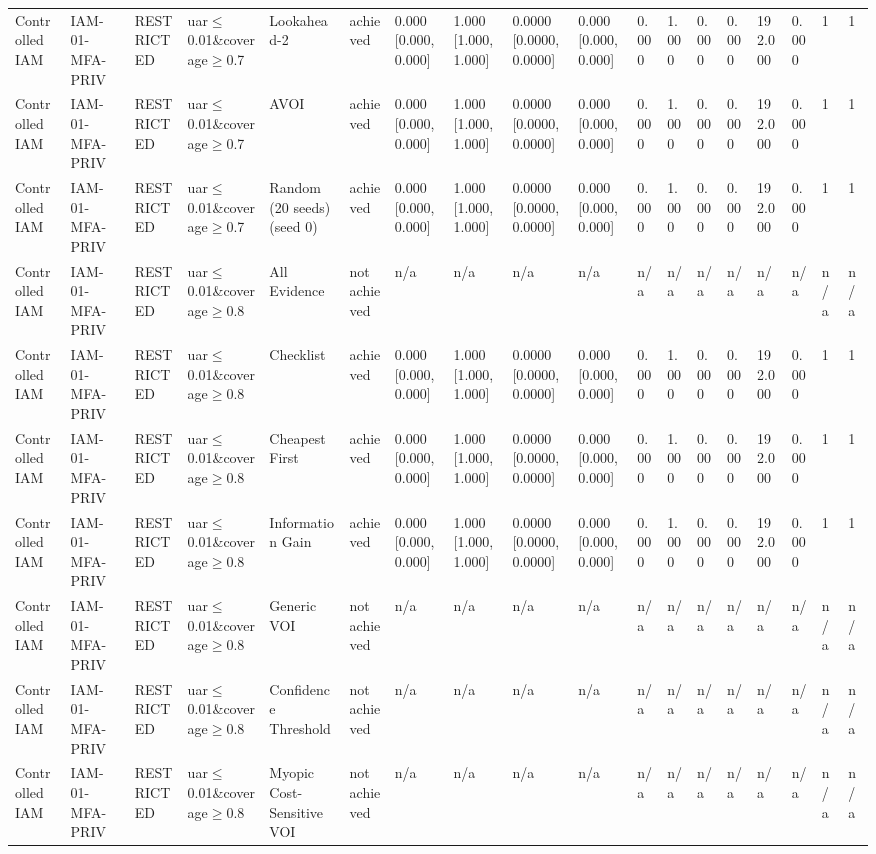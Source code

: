 \begin{table}[!ht]
{\begin{tabular}{llllllllllllllllll}
Controlled IAM & IAM-01-MFA-PRIV & RESTRICTED & uar$\le$0.01\&coverage$\ge$0.7 & Lookahead-2 & achieved & 0.000 [0.000, 0.000] & 1.000 [1.000, 1.000] & 0.0000 [0.0000, 0.0000] & 0.000 [0.000, 0.000] & 0.000 & 1.000 & 0.000 & 0.000 & 192.000 & 0.000 & 1 & 1 \\
Controlled IAM & IAM-01-MFA-PRIV & RESTRICTED & uar$\le$0.01\&coverage$\ge$0.7 & AVOI & achieved & 0.000 [0.000, 0.000] & 1.000 [1.000, 1.000] & 0.0000 [0.0000, 0.0000] & 0.000 [0.000, 0.000] & 0.000 & 1.000 & 0.000 & 0.000 & 192.000 & 0.000 & 1 & 1 \\
Controlled IAM & IAM-01-MFA-PRIV & RESTRICTED & uar$\le$0.01\&coverage$\ge$0.7 & Random (20 seeds) (seed 0) & achieved & 0.000 [0.000, 0.000] & 1.000 [1.000, 1.000] & 0.0000 [0.0000, 0.0000] & 0.000 [0.000, 0.000] & 0.000 & 1.000 & 0.000 & 0.000 & 192.000 & 0.000 & 1 & 1 \\
Controlled IAM & IAM-01-MFA-PRIV & RESTRICTED & uar$\le$0.01\&coverage$\ge$0.8 & All Evidence & not achieved & n/a & n/a & n/a & n/a & n/a & n/a & n/a & n/a & n/a & n/a & n/a & n/a \\
Controlled IAM & IAM-01-MFA-PRIV & RESTRICTED & uar$\le$0.01\&coverage$\ge$0.8 & Checklist & achieved & 0.000 [0.000, 0.000] & 1.000 [1.000, 1.000] & 0.0000 [0.0000, 0.0000] & 0.000 [0.000, 0.000] & 0.000 & 1.000 & 0.000 & 0.000 & 192.000 & 0.000 & 1 & 1 \\
Controlled IAM & IAM-01-MFA-PRIV & RESTRICTED & uar$\le$0.01\&coverage$\ge$0.8 & Cheapest First & achieved & 0.000 [0.000, 0.000] & 1.000 [1.000, 1.000] & 0.0000 [0.0000, 0.0000] & 0.000 [0.000, 0.000] & 0.000 & 1.000 & 0.000 & 0.000 & 192.000 & 0.000 & 1 & 1 \\
Controlled IAM & IAM-01-MFA-PRIV & RESTRICTED & uar$\le$0.01\&coverage$\ge$0.8 & Information Gain & achieved & 0.000 [0.000, 0.000] & 1.000 [1.000, 1.000] & 0.0000 [0.0000, 0.0000] & 0.000 [0.000, 0.000] & 0.000 & 1.000 & 0.000 & 0.000 & 192.000 & 0.000 & 1 & 1 \\
Controlled IAM & IAM-01-MFA-PRIV & RESTRICTED & uar$\le$0.01\&coverage$\ge$0.8 & Generic VOI & not achieved & n/a & n/a & n/a & n/a & n/a & n/a & n/a & n/a & n/a & n/a & n/a & n/a \\
Controlled IAM & IAM-01-MFA-PRIV & RESTRICTED & uar$\le$0.01\&coverage$\ge$0.8 & Confidence Threshold & not achieved & n/a & n/a & n/a & n/a & n/a & n/a & n/a & n/a & n/a & n/a & n/a & n/a \\
Controlled IAM & IAM-01-MFA-PRIV & RESTRICTED & uar$\le$0.01\&coverage$\ge$0.8 & Myopic Cost-Sensitive VOI & not achieved & n/a & n/a & n/a & n/a & n/a & n/a & n/a & n/a & n/a & n/a & n/a & n/a \\

\end{tabular}}
\end{table}
